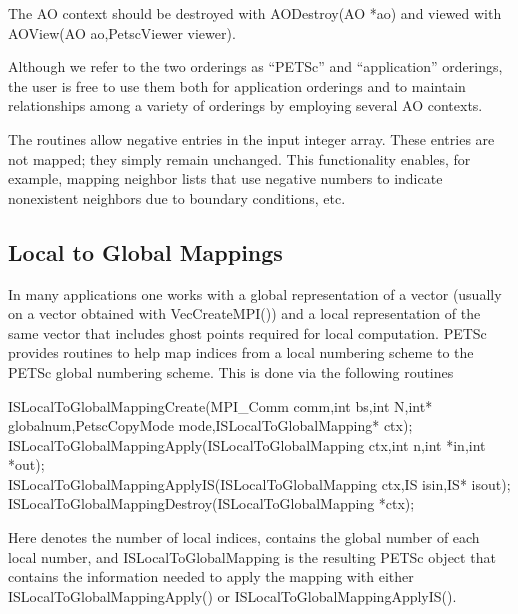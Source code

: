 The AO context should be destroyed with AODestroy(AO *ao)
and viewed with AOView(AO ao,PetscViewer viewer).

Although we refer to the two orderings as ``PETSc'' and
``application'' orderings, the user is free to use them both for
application orderings and to maintain relationships among a variety of
orderings by employing several AO contexts.

The  routines allow negative entries in the input
integer array. These entries are not mapped; they simply remain
unchanged.  This functionality enables, for example, mapping neighbor
lists that use negative numbers to indicate nonexistent neighbors due
to boundary conditions, etc.

\subsection{Local to Global Mappings}
\label{sec_islocaltoglobalmapping}

In many applications one works with a global representation of a vector
(usually on a vector obtained with VecCreateMPI())
and a local representation of the same vector that includes ghost points
required for local computation.  
 
PETSc provides routines to help map indices from a local numbering scheme to
the PETSc global numbering scheme. This is done via the following routines
\begin{tabbing}
  ISLocalToGlobalMappingCreate(MPI\_Comm comm,int bs,int N,int* globalnum,PetscCopyMode mode,ISLocalToGlobalMapping* ctx);\\
  ISLocalToGlobalMappingApply(ISLocalToGlobalMapping ctx,int n,int *in,int *out);\\
  ISLocalToGlobalMappingApplyIS(ISLocalToGlobalMapping ctx,IS isin,IS* isout);\\
  ISLocalToGlobalMappingDestroy(ISLocalToGlobalMapping *ctx);
\end{tabbing}
Here  denotes the number of local indices,  contains the
global number of each local number, and ISLocalToGlobalMapping is the
resulting PETSc object that contains the information needed to apply the mapping with
either ISLocalToGlobalMappingApply() or
ISLocalToGlobalMappingApplyIS().

